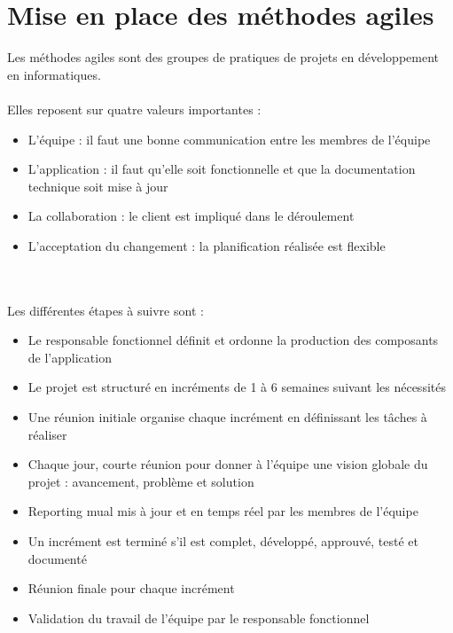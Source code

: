 \chapter{Mise en place des méthodes agiles}
Les méthodes agiles sont des groupes de pratiques de projets en développement en informatiques.\\
\\
Elles reposent sur quatre valeurs importantes : \\
\begin{itemize}
\item{L'équipe : il faut une bonne communication entre les membres de l'équipe}
\item{L'application : il faut qu'elle soit fonctionnelle et que la documentation technique soit mise à jour}
\item{La collaboration : le client est impliqué dans le déroulement}
\item{L'acceptation du changement : la planification réalisée est flexible}
\end{itemize} 
~\\
~\\
Les différentes étapes à suivre sont : \\
\begin{itemize}
\item{Le responsable fonctionnel définit et ordonne la production des composants de l'application}
\item{Le projet est structuré en incréments de 1 à 6 semaines suivant les nécessités}
\item{Une réunion initiale organise chaque incrément en définissant les tâches à réaliser}
\item{Chaque jour, courte réunion pour donner à l'équipe une vision globale du projet : avancement, problème et solution}
\item{Reporting mual mis à jour et en temps réel par les membres de l'équipe}
\item{Un incrément est terminé s'il est complet, développé, approuvé, testé et documenté}
\item{Réunion finale pour chaque incrément}
\item{Validation du travail de l'équipe par le responsable fonctionnel}
\end{itemize}
